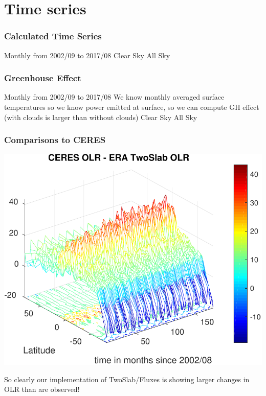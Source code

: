 \documentclass[10pt,t]{beamer}
\begin{document}
\section{Time series}
\begin{frame}
  \frametitle{Calculated Time Series}
  Monthly from 2002/09 to 2017/08 \newline
  \hspace{0.50in} Clear Sky  \hspace{1.75in} All Sky \\
  \begin{center}
  \end{center}
\end{frame}
\begin{frame}
  \frametitle{Greenhouse Effect}
  Monthly from 2002/09 to 2017/08 \newline
  We know monthly averaged surface temperatures so we know power emitted at surface, so we can compute GH effect (with clouds
  is larger than without clouds) \newline
  \hspace{0.50in} Clear Sky  \hspace{1.75in} All Sky \\
  \begin{center}
  \end{center}
\end{frame}
\begin{frame}
  \frametitle{Comparisons to CERES}
  \begin{center}
    \noindent\includegraphics[width=0.75\linewidth]{Figs/ceresVSghgNcloudeffect_lat_time.pdf}
  \end{center}
  So clearly our implementation of TwoSlab/Fluxes is showing larger changes in OLR than are observed!
\end{frame}
\end{document}
